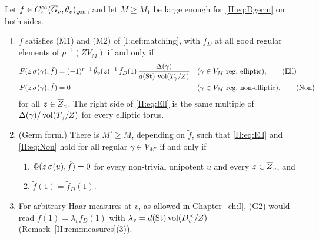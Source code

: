 \begin{theorem}\label{II:thm:germ}
Let $\tilde f\in C_c^\infty(\overline{G}_v,\tilde\theta_v)_{\mathrm{gen}}$, and let $M\ge M_1$ be large enough for \eqref{II:eq:Dgerm} on both sides.
\begin{enumerate}[label=(\alph*)]
\item $\tilde f$ satisfies (M1) and (M2) of \cref{I:def:matching}, with $\tilde f_D$ at all good regular elements of $p^{-1}(ZV_M)$ if and only if
\begin{align}
F(z\,\sg(\gamma),\tilde f)&=(-1)^{r-1}\,\tilde\theta_v(z)^{-1}\,\tilde f_D(1)\,\frac{\Delta(\gamma)}{d(\St)\,\vol(T_\gamma/Z)}&&(\gamma\in V_M\ \text{reg.\ elliptic}),\tag{Ell}\label{II:eq:Ell}\\
F(z\,\sg(\gamma),\tilde f)&=0&&(\gamma\in V_M\ \text{reg.\ non-elliptic}),\tag{Non}\label{II:eq:Non}
\end{align}
for all $z\in\overline{Z}_v$. The right side of \eqref{II:eq:Ell} is the same multiple of $\Delta(\gamma)/\operatorname{vol}(T_\gamma/Z)$ for every elliptic torus.
\item (Germ form.) There is $M'\ge M$, depending on $\tilde f$, such that \eqref{II:eq:Ell} and \eqref{II:eq:Non} hold for all regular $\gamma\in V_{M'}$ if and only if
\begin{enumerate}[label=(G\arabic*)]
\item $\Phi(z\,\sigma(u),\tilde f)=0$ for every non-trivial unipotent $u$ and every $z\in\overline{Z}_v$, and
\item $\tilde f(1)=\tilde f_D(1)$.
\end{enumerate}
\item For arbitrary Haar measures at $v$, as allowed in Chapter~\ref{ch:I}, (G2) would read $\tilde f(1)=\lambda_v\tilde f_D(1)$ with $\lambda_v=d(\mathrm{St})\operatorname{vol}(D_v^\times/Z)$ (Remark~\ref{II:rem:measures}(3)).
\end{enumerate}
\end{theorem}
